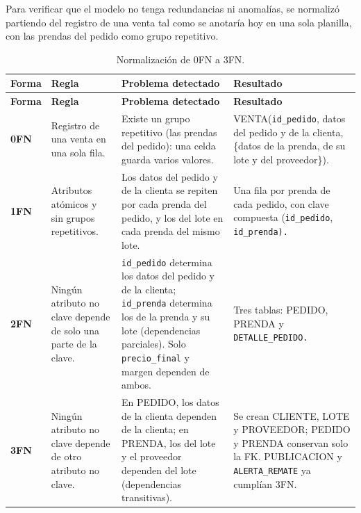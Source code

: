 \documentclass[11pt,letterpaper]{article}
\begin{document}
Para verificar que el modelo no tenga redundancias ni anomalías, se normalizó partiendo del registro de una venta tal como se anotaría hoy en una sola planilla, con las prendas del pedido como grupo repetitivo.
{\scriptsize
\setlength{\tabcolsep}{3pt}\renewcommand{\arraystretch}{1.15}
\begin{longtable}{>{\raggedright\arraybackslash}p{}>{\raggedright\arraybackslash}p{}>{\raggedright\arraybackslash}p{}>{\raggedright\arraybackslash}p{}}
\caption{Normalización de 0FN a 3FN.}\\
\hline
\rowcolor[HTML]{D9EAF7}\textbf{\textbf{Forma}} & \textbf{\textbf{Regla}} & \textbf{\textbf{Problema detectado}} & \textbf{\textbf{Resultado}} \\
\hline
\endfirsthead
\hline
\rowcolor[HTML]{D9EAF7}\textbf{\textbf{Forma}} & \textbf{\textbf{Regla}} & \textbf{\textbf{Problema detectado}} & \textbf{\textbf{Resultado}} \\
\hline
\endhead
\textbf{0FN} & Registro de una venta en una sola fila. & Existe un grupo repetitivo (las prendas del pedido): una celda guarda varios valores. & VENTA(\texttt{id\_\allowbreak{}pedido}, datos del pedido y de la clienta, \{datos de la prenda, de su lote y del proveedor\}). \\
\hline
\textbf{1FN} & Atributos atómicos y sin grupos repetitivos. & Los datos del pedido y de la clienta se repiten por cada prenda del pedido, y los del lote en cada prenda del mismo lote. & Una fila por prenda de cada pedido, con clave compuesta (\texttt{id\_\allowbreak{}pedido}, \texttt{id\_\allowbreak{}prenda).} \\
\hline
\textbf{2FN} & Ningún atributo no clave depende de solo una parte de la clave. & \texttt{id\_\allowbreak{}pedido} determina los datos del pedido y de la clienta; \texttt{id\_\allowbreak{}prenda} determina los de la prenda y su lote (dependencias parciales). Solo \texttt{precio\_\allowbreak{}final} y margen dependen de ambos. & Tres tablas: PEDIDO, PRENDA y \texttt{DETALLE\_\allowbreak{}PEDIDO.} \\
\hline
\textbf{3FN} & Ningún atributo no clave depende de otro atributo no clave. & En PEDIDO, los datos de la clienta dependen de la clienta; en PRENDA, los del lote y el proveedor dependen del lote (dependencias transitivas). & Se crean CLIENTE, LOTE y PROVEEDOR; PEDIDO y PRENDA conservan solo la FK. PUBLICACION y \texttt{ALERTA\_\allowbreak{}REMATE} ya cumplían 3FN. \\
\hline
\end{longtable}
}
\end{document}
